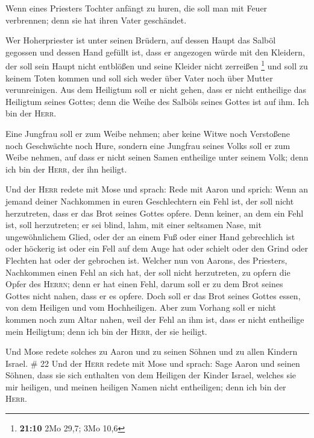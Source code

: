  Wenn eines Priesters Tochter anfängt zu huren, die soll
man mit Feuer verbrennen; denn sie hat ihren Vater geschändet.

 Wer Hoherpriester ist unter seinen Brüdern, auf dessen
Haupt das Salböl gegossen und dessen Hand gefüllt ist, dass er angezogen
würde mit den Kleidern, der soll sein Haupt nicht entblößen und seine
Kleider nicht zerreißen \footnote{\textbf{21:10} 2Mo 29,7; 3Mo 10,6}
 und soll zu keinem Toten kommen und soll sich weder über
Vater noch über Mutter verunreinigen.  Aus dem Heiligtum
soll er nicht gehen, dass er nicht entheilige das Heiligtum seines
Gottes; denn die Weihe des Salböls seines Gottes ist auf ihm. Ich bin
der \textsc{Herr}.

 Eine Jungfrau soll er zum Weibe nehmen; 
aber keine Witwe noch Verstoßene noch Geschwächte noch Hure, sondern
eine Jungfrau seines Volks soll er zum Weibe nehmen,  auf
dass er nicht seinen Samen entheilige unter seinem Volk; denn ich bin
der \textsc{Herr}, der ihn heiligt.

 Und der \textsc{Herr} redete mit Mose und sprach:
 Rede mit Aaron und sprich: Wenn an jemand deiner
Nachkommen in euren Geschlechtern ein Fehl ist, der soll nicht
herzutreten, dass er das Brot seines Gottes opfere.  Denn
keiner, an dem ein Fehl ist, soll herzutreten; er sei blind, lahm, mit
einer seltsamen Nase, mit ungewöhnlichem Glied,  oder der
an einem Fuß oder einer Hand gebrechlich ist  oder
höckerig ist oder ein Fell auf dem Auge hat oder schielt oder den Grind
oder Flechten hat oder der gebrochen ist.  Welcher nun
von Aarons, des Priesters, Nachkommen einen Fehl an sich hat, der soll
nicht herzutreten, zu opfern die Opfer des \textsc{Herrn}; denn er hat
einen Fehl, darum soll er zu dem Brot seines Gottes nicht nahen, dass er
es opfere.  Doch soll er das Brot seines Gottes essen,
von dem Heiligen und vom Hochheiligen.  Aber zum Vorhang
soll er nicht kommen noch zum Altar nahen, weil der Fehl an ihm ist,
dass er nicht entheilige mein Heiligtum; denn ich bin der \textsc{Herr},
der sie heiligt.

 Und Mose redete solches zu Aaron und zu seinen Söhnen
und zu allen Kindern Israel. \# 22  Und der \textsc{Herr}
redete mit Mose und sprach:  Sage Aaron und seinen Söhnen,
dass sie sich enthalten von dem Heiligen der Kinder Israel, welches sie
mir heiligen, und meinen heiligen Namen nicht entheiligen; denn ich bin
der \textsc{Herr}.

